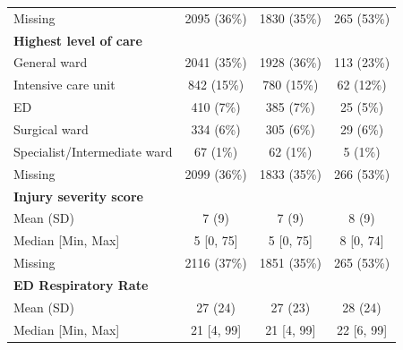 \documentclass[12pt, a4paper]{article}
\begin{document}
\begin{appendices}
\begin{table}[t!]
{\begin{tabular}{lccc}
				\hspace{3mm}Missing                           & 2095 (36\%)       & 1830 (35\%)       & 265 (53\%)       \\
				\textbf{Highest level of care}                &                   &                   &                  \\
				\hspace{3mm}General ward                      & 2041 (35\%)       & 1928 (36\%)       & 113 (23\%)       \\
				\hspace{3mm}Intensive care unit               & 842 (15\%)        & 780 (15\%)        & 62 (12\%)        \\
				\hspace{3mm}ED                                & 410 (7\%)         & 385 (7\%)         & 25 (5\%)         \\
				\hspace{3mm}Surgical ward                     & 334 (6\%)         & 305 (6\%)         & 29 (6\%)         \\
				\hspace{3mm}Specialist/Intermediate ward      & 67 (1\%)          & 62 (1\%)          & 5 (1\%)          \\
				\hspace{3mm}Missing                           & 2099 (36\%)       & 1833 (35\%)       & 266 (53\%)       \\
				\textbf{Injury severity score}                &                   &                   &                  \\
				\hspace{3mm}Mean (SD)                         & 7 (9)             & 7 (9)             & 8 (9)            \\
				\hspace{3mm}Median [Min, Max]                 & 5 [0, 75]         & 5 [0, 75]         & 8 [0, 74]        \\
				\hspace{3mm}Missing                           & 2116 (37\%)       & 1851 (35\%)       & 265 (53\%)       \\
				\textbf{ED Respiratory Rate}                  &                   &                   &                  \\
				\hspace{3mm}Mean (SD)                         & 27 (24)           & 27 (23)           & 28 (24)          \\
				\hspace{3mm}Median [Min, Max]                 & 21 [4, 99]        & 21 [4, 99]        & 22 [6, 99]       \\

\end{tabular}}
\end{table}
\end{appendices}
\end{document}
